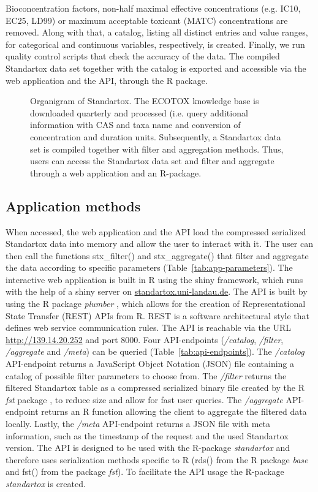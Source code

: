 \documentclass[journal,datadescriptor,accept,moreauthors,pdftex]{Definitions/mdpi}
\begin{document}
Bioconcentration factors, non-half maximal effective concentrations (e.g. IC10, EC25, LD99) or maximum acceptable toxicant (MATC) concentrations are removed. Along with that, a catalog, listing all distinct entries and value ranges, for categorical and continuous variables, respectively, is created. Finally, we run quality control scripts that check the accuracy of the data. The compiled Standartox data set together with the catalog is exported and accessible via the web application and the API, through the R package.

\begin{figure}[H]
    \centering
    
    \caption{Organigram of Standartox. The ECOTOX knowledge base is downloaded quarterly and processed (i.e. query additional information with CAS and taxa name and conversion of concentration and duration units. Subsequently, a Standartox data set is compiled together with filter and aggregation methods. Thus, users can access the Standartox data set and filter and aggregate through a web application and an R-package.}
    \label{fig:stx-organigram}
\end{figure}

\subsection{Application methods}
When accessed, the web application and the API load the compressed serialized Standartox data into memory and allow the user to interact with it. The user can then call the functions stx\_filter() and stx\_aggregate() that filter and aggregate the data according to specific parameters (Table~\ref{tab:app-parameters}). The interactive web application is built in R using the shiny framework, which runs with the help of a shiny server \citep{chang_shiny_2018} on \url{standartox.uni-landau.de}. The API is built by using the R package \textit{plumber} \citep{trestletechnologyllc_plumber_2018}, which allows for the creation of Representational State Transfer (REST) APIs from R. REST is a software architectural style that defines web service communication rules. The API is reachable via the URL \url{http://139.14.20.252} and port 8000. Four API-endpoints (\textit{/catalog}, \textit{/filter}, \textit{/aggregate} and \textit{/meta}) can be queried (Table~\ref{tab:api-endpoints}). The \textit{/catalog} API-endpoint returns a JavaScript Object Notation (JSON) file containing a catalog of possible filter parameters to choose from. The \textit{/filter} returns the filtered Standartox table as a compressed serialized binary file created by the R \textit{fst} package \citep{klik_fst_2019}, to reduce size and allow for fast user queries. The \textit{/aggregate} API-endpoint returns an R function allowing the client to aggregate the filtered data locally. Lastly, the \textit{/meta} API-endpoint returns a JSON file with meta information, such as the timestamp of the request and the used Standartox version. The API is designed to be used with the R-package \textit{standartox} and therefore uses serialization methods specific to R (rds() from the R package \textit{base} and fst() from the package \textit{fst}). To facilitate the API usage the R-package \textit{standartox} is created.
\end{document}
